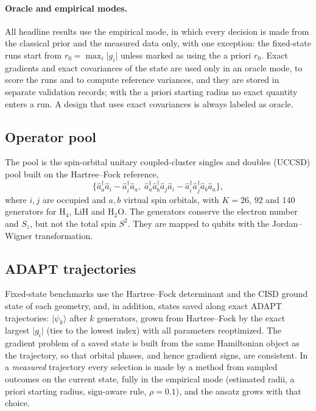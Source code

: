 \documentclass[aps,pra,reprint,superscriptaddress,nofootinbib]{revtex4-2}
\begin{document}
\paragraph{Oracle and empirical modes.} All headline results use the empirical mode, in which every decision is made from the classical prior and the measured data only, with one exception: the fixed-state runs start from $r_0=\max_i\lvert g_i\rvert$ unless marked as using the a priori $r_0$. Exact gradients and exact covariances of the state are used only in an oracle mode, to score the runs and to compute reference variances, and they are stored in separate validation records; with the a priori starting radius no exact quantity enters a run. A design that uses exact covariances is always labeled as oracle.

\subsection{Operator pool}

The pool is the spin-orbital unitary coupled-cluster singles and doubles (UCCSD) pool built on the Hartree--Fock reference,
\begin{equation}
\{\hat a_a^\dagger\hat a_i-\hat a_i^\dagger\hat a_a ,\;
\hat a_a^\dagger\hat a_b^\dagger\hat a_j\hat a_i-\hat a_i^\dagger\hat a_j^\dagger\hat a_b\hat a_a\},
\end{equation}
where $i,j$ are occupied and $a,b$ virtual spin orbitals, with $K=26$, $92$ and $140$ generators for H$_4$, LiH and H$_2$O. The generators conserve the electron number and $S_z$, but not the total spin $S^2$. They are mapped to qubits with the Jordan--Wigner transformation. 

\subsection{ADAPT trajectories}

Fixed-state benchmarks use the Hartree--Fock determinant and the CISD ground state of each geometry, and, in addition, states saved along exact ADAPT trajectories: $\lvert\psi_k\rangle$ after $k$ generators, grown from Hartree--Fock by the exact largest $\lvert g_i\rvert$ (ties to the lowest index) with all parameters reoptimized. The gradient problem of a saved state is built from the same Hamiltonian object as the trajectory, so that orbital phases, and hence gradient signs, are consistent. In a \emph{measured} trajectory every selection is made by a method from sampled outcomes on the current state, fully in the empirical mode (estimated radii, a priori starting radius, sign-aware rule, $\rho=0.1$), and the ansatz grows with that choice.
\end{document}
